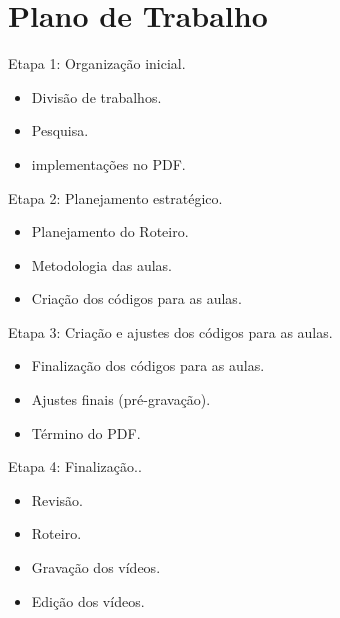 \documentclass[a4paper,12pt]{article}  %
\begin{document}


\section{Plano de Trabalho}

    Etapa 1: Organização inicial.
    \begin{itemize}
        \item Divisão de trabalhos.
        \item Pesquisa.
        \item implementações no PDF.
    \end{itemize}
     Etapa 2: Planejamento estratégico.
    \begin{itemize}
        \item Planejamento do Roteiro.
        \item Metodologia das aulas.
        \item Criação dos códigos para as aulas.
    \end{itemize}
     Etapa 3: Criação e ajustes dos códigos para as aulas.
    \begin{itemize}
        \item Finalização dos códigos para as aulas.
        \item Ajustes finais (pré-gravação).
        \item Término do PDF.
    \end{itemize}
     Etapa 4: Finalização..
    \begin{itemize}
        \item Revisão.
        \item Roteiro.
        \item Gravação dos vídeos.
        \item Edição dos vídeos.
    \end{itemize}
\end{document}
